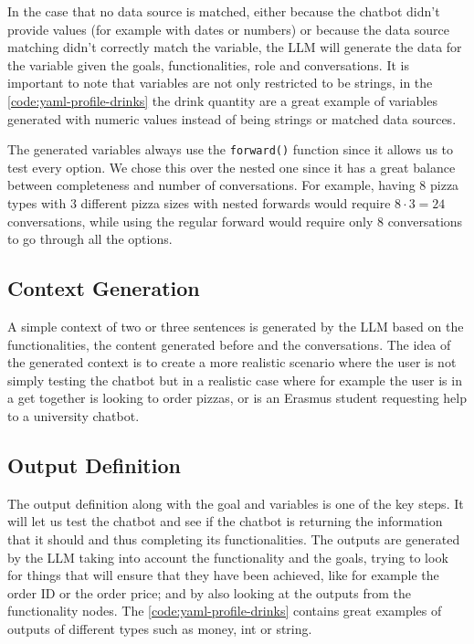 In the case that no data source is matched,
either because the chatbot didn't provide values
(for example with dates or numbers)
or because the data source matching didn't correctly match the variable,
the \ac{LLM} will generate the data for the variable given
the goals, functionalities, role and conversations.
It is important to note that variables are not only restricted to be strings,
in the \autoref{code:yaml-profile-drinks} the drink quantity
are a great example of variables generated
with numeric values instead of being strings or matched data sources.

The generated variables always use the \texttt{forward()} function
since it allows us to test every option.
We chose this over the nested one
since it has a great balance between completeness and number of conversations.
For example, having $8$ pizza types with $3$ different pizza sizes
with nested forwards would require $8 \cdot 3 = 24$ conversations,
while using the regular forward would require only $8$ conversations
to go through all the options.

\subsection{Context Generation}

A simple context of two or three sentences
is generated by the \ac{LLM} based on
the functionalities, the content generated before and the conversations.
The idea of the generated context is to create a more realistic scenario
where the user is not simply testing the chatbot
but in a realistic case where for example
the user is in a get together is looking to order pizzas,
or is an Erasmus student requesting help to a university chatbot.

\subsection{Output Definition}

The output definition along with the goal and variables is one of the key steps.
It will let us test the chatbot
and see if the chatbot is returning the information that it should
and thus completing its functionalities.
The outputs are generated by the \ac{LLM}
taking into account the functionality and the goals,
trying to look for things that will ensure that they have been achieved,
like for example the order ID or the order price;
and by also looking at the outputs from the functionality nodes.
The \autoref{code:yaml-profile-drinks} contains great examples
of outputs of different types such as money, int or string.

